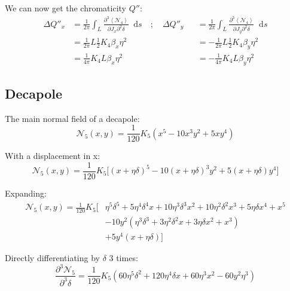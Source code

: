 \documentclass[12pt,a4,]{article}
\numberwithin{equation}{subsection}
\newcommand*\diff{\mathop{}\!\mathrm{d}}
\begin{document}
We can now get the chromaticity \(Q''\): \begin{equation}\begin{aligned}
\Delta Q''_x &= \frac{1}{2\pi} \int_L \frac{\partial^3 \left< \mathcal{N_4} \right>}{\partial J_x \partial^2 \delta} \diff s \quad; \quad \Delta Q''_y &&= \frac{1}{2\pi} \int_L \frac{\partial^3 \left< \mathcal{N_4} \right>}{\partial J_y \partial^2 \delta} \diff s \\
&= \frac{1}{2 \pi} L \frac{1}{2} K_4 \beta_x \eta^2  &&= - \frac{1}{2 \pi} L \frac{1}{2} K_4 \beta_y \eta^2 \\
&= \frac{1}{4 \pi}  K_4 L \beta_x \eta^2 &&= - \frac{1}{4 \pi}  K_4 L \beta_y \eta^2
\end{aligned}\end{equation}

\hypertarget{decapole-1}{%
\subsection{Decapole}\label{decapole-1}}

The main normal field of a decapole:
\begin{equation}\mathcal{N_5}(x, y) = \frac{1}{120} K_{5} \left(x^5 - 10 x^3y^2 + 5xy^4 \right)\end{equation}

With a displacement in x:
\begin{equation}\mathcal{N_5}(x, y) = \frac{1}{120} K_{5} \biggl[(x+\eta\delta)^5 - 10 (x+\eta\delta)^3y^2 + 5(x+\eta\delta)y^4 \biggr]\end{equation}

Expanding: \begin{equation}\begin{aligned}
\mathcal{N_5}(x, y) = \frac{1}{120} K_{5} \biggl[&
  \eta^5\delta^5 + 5\eta^4\delta^4x + 10\eta^3\delta^3x^2 + 10\eta^2\delta^2 x^3 + 5\eta\delta x^4 + x^5 \\
  & -10y^2 (\eta^3\delta^3 + 3\eta^2\delta^2x + 3\eta\delta x^2 + x^3)\\
  & +5y^4 (x + \eta\delta) \biggr]
\end{aligned}\label{eq:decapole_expanded}\end{equation}

Directly differentiating by \(\delta\) 3 times:
\begin{equation}\frac{\partial^3 \mathcal{N_5}}{\partial^3 \delta} = \frac{1}{120} K_5 \left( 60\eta^5\delta^2 + 120 \eta^4\delta x + 60\eta^3x^2 - 60y^2\eta^3\right)\end{equation}
\end{document}
